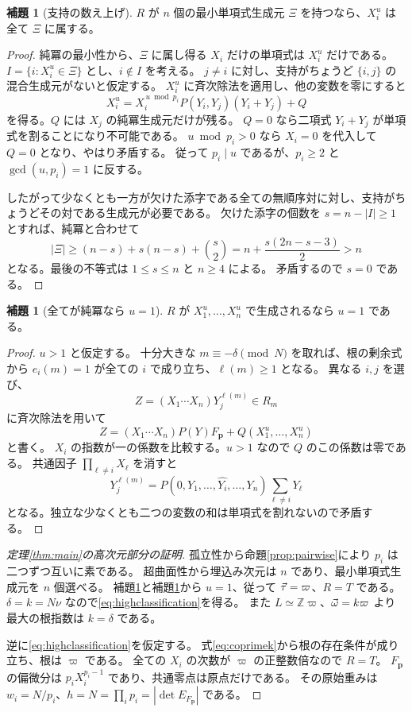 \documentclass[11pt,a4paper]{ltjsarticle}
\numberwithin{equation}{section}
\theoremstyle{definition}
\newtheorem{lemma}[theorem]{補題}
\newcommand{\Z}{\mathbb Z}\newcommand{\N}{\mathbb N}\newcommand{\Q}{\mathbb Q}\newcommand{\C}{\mathbb C}
\newcommand{\bp}{\mathbf p}\newcommand{\bw}{\mathbf w}\newcommand{\one}{\mathbf 1}
\begin{document}
\begin{lemma}[支持の数え上げ]\label{lem:highergenerators}
$R$ が $n$ 個の最小単項式生成元 $\Xi$ を持つなら、$X_i^u$ は全て $\Xi$ に属する。
\end{lemma}
\begin{proof}
純冪の最小性から、$\Xi$ に属し得る $X_i$ だけの単項式は $X_i^u$ だけである。
$I=\{i:X_i^u\in\Xi\}$ とし、$i\notin I$ を考える。
$j\ne i$ に対し、支持がちょうど $\{i,j\}$ の混合生成元がないと仮定する。
$X_i^u$ に斉次除法を適用し、他の変数を零にすると
\[
 X_i^u=X_i^{\,u\bmod p_i}P(Y_i,Y_j)(Y_i+Y_j)+Q
\]
を得る。$Q$ には $X_j$ の純冪生成元だけが残る。
$Q=0$ なら二項式 $Y_i+Y_j$ が単項式を割ることになり不可能である。
$u\bmod p_i>0$ なら $X_i=0$ を代入して $Q=0$ となり、やはり矛盾する。
従って $p_i\mid u$ であるが、$p_i\ge2$ と $\gcd(u,p_i)=1$ に反する。

したがって少なくとも一方が欠けた添字である全ての無順序対に対し、支持がちょうどその対である生成元が必要である。
欠けた添字の個数を $s=n-|I|\ge1$ とすれば、純冪と合わせて
\[
 |\Xi|\ge(n-s)+s(n-s)+\binom s2
 =n+\frac{s(2n-s-3)}2>n
\]
となる。最後の不等式は $1\le s\le n$ と $n\ge4$ による。
矛盾するので $s=0$ である。
\end{proof}

\begin{lemma}[全てが純冪なら $u=1$]\label{lem:pureone}
$R$ が $X_1^u,\dots,X_n^u$ で生成されるなら $u=1$ である。
\end{lemma}
\begin{proof}
$u>1$ と仮定する。
十分大きな $m\equiv-\delta\pmod N$ を取れば、根の剰余式から $e_i(m)=1$ が全ての $i$ で成り立ち、$\ell(m)\ge1$ となる。
異なる $i,j$ を選び、
\[
 Z=(X_1\cdots X_n)Y_j^{\ell(m)}\in R_m
\]
に斉次除法を用いて
\[
 Z=(X_1\cdots X_n)P(Y)F_{\bp}
     +Q(X_1^u,\dots,X_n^u)
\]
と書く。
$X_i$ の指数が一の係数を比較する。$u>1$ なので $Q$ のこの係数は零である。
共通因子 $\prod_{\ell\ne i}X_\ell$ を消すと
\[
 Y_j^{\ell(m)}=P(0,Y_1,\dots,\widehat{Y_i},\dots,Y_n)
                    \sum_{\ell\ne i}Y_\ell
\]
となる。独立な少なくとも二つの変数の和は単項式を割れないので矛盾する。
\end{proof}

\begin{proof}[定理\ref{thm:main}の高次元部分の証明]
孤立性から命題\ref{prop:pairwise}により $p_i$ は二つずつ互いに素である。
超曲面性から埋込み次元は $n$ であり、最小単項式生成元を $n$ 個選べる。
補題\ref{lem:highergenerators}と補題\ref{lem:pureone}から $u=1$、従って $\vec\tau=\varpi$、$R=T$ である。
$\delta=k=N\nu$ なので\eqref{eq:highclassification}を得る。
また $L\simeq\Z\varpi$、$\vec\omega=k\varpi$ より最大の根指数は $k=\delta$ である。

逆に\eqref{eq:highclassification}を仮定する。
式\eqref{eq:coprimek}から根の存在条件が成り立ち、根は $\varpi$ である。
全ての $X_i$ の次数が $\varpi$ の正整数倍なので $R=T$。
$F_{\bp}$ の偏微分は $p_iX_i^{p_i-1}$ であり、共通零点は原点だけである。
その原始重みは $w_i=N/p_i$、$h=N=\prod_i p_i=|\det E_{F_{\bp}}|$ である。
\end{proof}
\end{document}

